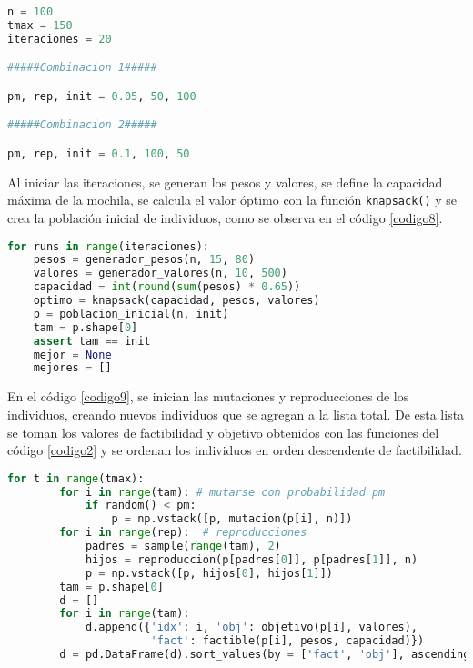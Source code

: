 \documentclass{article}
\begin{document}
\begin{lstlisting}[caption={Par\'ametros Iniciales}, label=codigo7, language=Python]
n = 100
tmax = 150
iteraciones = 20

#####Combinacion 1#####

pm, rep, init = 0.05, 50, 100

#####Combinacion 2#####

pm, rep, init = 0.1, 100, 50
\end{lstlisting}

Al iniciar las iteraciones, se generan los pesos y valores, se define la capacidad m\'axima de la mochila, se calcula el valor \'optimo con la funci\'on \texttt{knapsack()} y se crea la poblaci\'on inicial de individuos, como se observa en el c\'odigo \ref{codigo8}.

\begin{lstlisting}[caption=Inicio de Iteraciones, label=codigo8, language=Python]
for runs in range(iteraciones):
    pesos = generador_pesos(n, 15, 80)
    valores = generador_valores(n, 10, 500)
    capacidad = int(round(sum(pesos) * 0.65))
    optimo = knapsack(capacidad, pesos, valores)
    p = poblacion_inicial(n, init)
    tam = p.shape[0]
    assert tam == init
    mejor = None
    mejores = []
\end{lstlisting}

En el c\'odigo \ref{codigo9}, se inician las mutaciones y reproducciones de los individuos, creando nuevos individuos que se agregan a la lista total. De esta lista se toman los valores de factibilidad y objetivo obtenidos con las funciones del c\'odigo \ref{codigo2} y se ordenan los individuos en orden descendente de factibilidad.

\newpage

\begin{lstlisting}[caption={Mutaciones, Reproducciones y Ordenamiento de Factibilidad}, label=codigo9, language=Python]
    for t in range(tmax):
        for i in range(tam): # mutarse con probabilidad pm
            if random() < pm:
                p = np.vstack([p, mutacion(p[i], n)])
        for i in range(rep):  # reproducciones
            padres = sample(range(tam), 2)
            hijos = reproduccion(p[padres[0]], p[padres[1]], n)
            p = np.vstack([p, hijos[0], hijos[1]])
        tam = p.shape[0]
        d = []
        for i in range(tam):
            d.append({'idx': i, 'obj': objetivo(p[i], valores),
                      'fact': factible(p[i], pesos, capacidad)})
        d = pd.DataFrame(d).sort_values(by = ['fact', 'obj'], ascending = False)
\end{lstlisting}
\end{document}
